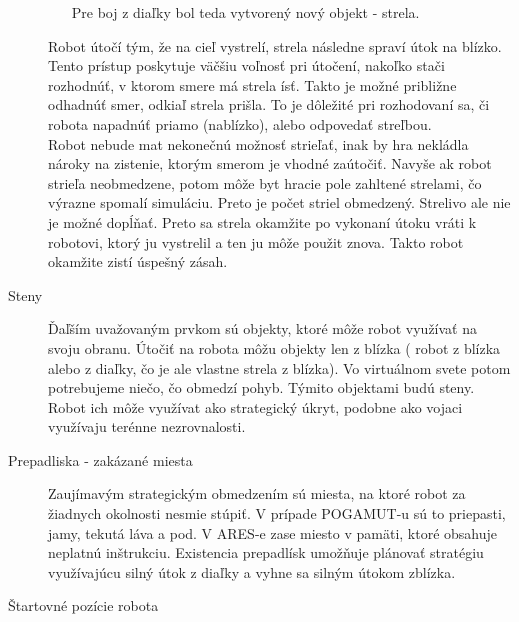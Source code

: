 \begin{description}
\begin{itemize}
Pre boj z diaľky bol teda vytvorený nový objekt - strela.
\end{itemize}
Robot útočí tým, že na cieľ vystrelí, strela následne spraví útok na blízko. Tento prístup poskytuje väčšiu voľnosť pri útočení, nakoľko stači rozhodnúť, v ktorom smere má strela ísť. Takto je možné približne odhadnúť smer, odkiaľ strela prišla. To je dôležité pri rozhodovaní sa, či robota napadnúť priamo (nablízko), alebo odpovedať streľbou. \\
\indent Robot nebude mat nekonečnú možnosť strieľať, inak by hra nekládla nároky na zistenie, ktorým smerom je vhodné zaútočiť. Navyše ak robot strieľa neobmedzene, potom môže byt hracie pole zahltené strelami, čo výrazne spomalí simuláciu. Preto je počet striel obmedzený. Strelivo ale nie je možné dopĺňať. Preto sa strela okamžite po vykonaní útoku vráti k robotovi, ktorý ju vystrelil a ten ju môže použit znova. Takto robot okamžite zistí úspešný zásah.%
\item[Steny] \hfill \newline
\indent Ďaľším uvažovaným prvkom sú objekty, ktoré môže robot využívať na svoju obranu. Útočiť na robota môžu objekty len z blízka ( robot z blízka alebo z diaľky, čo je ale vlastne strela z blízka).  Vo virtuálnom svete potom potrebujeme niečo, čo obmedzí pohyb. Týmito objektami budú steny. Robot ich môže využívat ako strategický úkryt, podobne ako vojaci využívaju terénne nezrovnalosti. %
\newline
\item[Prepadliska - zakázané miesta] \hfill \newline
\indent Zaujímavým strategickým obmedzením sú miesta, na ktoré robot za žiadnych okolnosti nesmie stúpiť. V prípade POGAMUT-u sú to priepasti, jamy, tekutá láva a pod. V ARES-e zase miesto v pamäti, ktoré obsahuje neplatnú inštrukciu. Existencia prepadlísk umožňuje plánovať stratégiu využívajúcu silný útok z diaľky a vyhne sa silným útokom zblízka. 
\newline
\item[Štartovné pozície robota]\hfill

\end{description}
